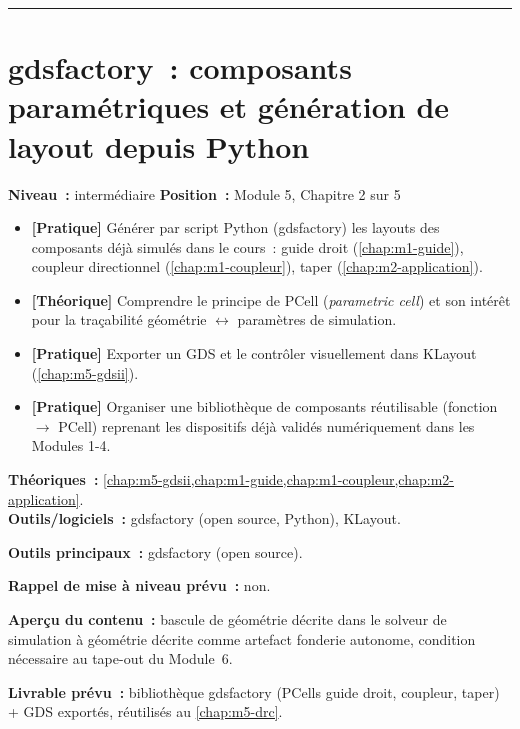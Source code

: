 \bigskip\hrule\bigskip

\chapter{gdsfactory~: composants paramétriques et génération de layout depuis Python}
\label{chap:m5-gdsfactory}

\noindent\textbf{Niveau~:} intermédiaire \hfill \textbf{Position~:} Module 5, Chapitre 2 sur 5

\begin{objectifs}
\begin{itemize}[leftmargin=1.4em]
  \item \textbf{[Pratique]} Générer par script Python (gdsfactory) les layouts des composants déjà simulés dans le cours~: guide droit (\cref{chap:m1-guide}), coupleur directionnel (\cref{chap:m1-coupleur}), taper (\cref{chap:m2-application}).
  \item \textbf{[Théorique]} Comprendre le principe de PCell (\emph{parametric cell}) et son intérêt pour la traçabilité géométrie $\leftrightarrow$ paramètres de simulation.
  \item \textbf{[Pratique]} Exporter un GDS et le contrôler visuellement dans KLayout (\cref{chap:m5-gdsii}).
  \item \textbf{[Pratique]} Organiser une bibliothèque de composants réutilisable (fonction $\to$ PCell) reprenant les dispositifs déjà validés numériquement dans les Modules 1-4.
\end{itemize}
\end{objectifs}

\begin{prerequis}
\textbf{Théoriques~:} \cref{chap:m5-gdsii,chap:m1-guide,chap:m1-coupleur,chap:m2-application}.\\
\textbf{Outils/logiciels~:} gdsfactory (open source, Python), KLayout.
\end{prerequis}

\noindent\textbf{Outils principaux~:} gdsfactory (open source).

\noindent\textbf{Rappel de mise à niveau prévu~:} non.

\noindent\textbf{Aperçu du contenu~:} bascule de \og géométrie décrite dans le solveur de simulation\fg{} à \og géométrie décrite comme artefact fonderie autonome\fg{}, condition nécessaire au tape-out du Module~6.

\noindent\textbf{Livrable prévu~:} bibliothèque gdsfactory (PCells guide droit, coupleur, taper) + GDS exportés, réutilisés au \cref{chap:m5-drc}.

